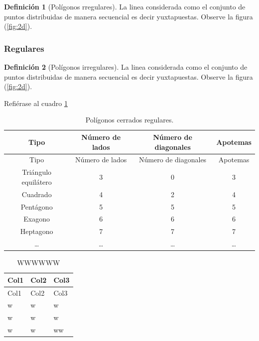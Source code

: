 \documentclass[
  16pt,
]{krantz}
\theoremstyle{definition}
\newtheorem{definition}{Definición}[chapter]
\theoremstyle{definition}
\theoremstyle{definition}
\theoremstyle{definition}
\theoremstyle{remark}
\begin{document}
\begin{definition}[Polígonos rregulares]
\protect\hypertarget{def:irregulares}{}{\label{def:irregulares} {} }La linea considerada como el conjunto de puntos distribuidas de manera secuencial es decir yuxtapuestas. Observe la figura (\ref{fig:2d}).
\end{definition}

\hypertarget{regulares}{%
\subsubsection{Regulares}\label{regulares}}

\begin{definition}[Polígonos irregulares]
\protect\hypertarget{def:regulares}{}{\label{def:regulares} {} }La linea considerada como el conjunto de puntos distribuidas de manera secuencial es decir yuxtapuestas. Observe la figura (\ref{fig:2d}).
\end{definition}

Refiérase al cuadro \ref{tab:regulares}

\begin{longtable}[]{@{}cccc@{}}
\caption{\label{tab:regulares} Polígonos cerrados regulares.}\tabularnewline
\toprule
Tipo & Número de lados & Número de diagonales & Apotemas \\
\midrule
\endfirsthead
\toprule
Tipo & Número de lados & Número de diagonales & Apotemas \\
\midrule
\endhead
Triángulo equilátero & 3 & 0 & 3 \\
Cuadrado & 4 & 2 & 4 \\
Pentágono & 5 & 5 & 5 \\
Exagono & 6 & 6 & 6 \\
Heptagono & 7 & 7 & 7 \\
\ldots{} & \ldots{} & \ldots{} & \ldots{} \\
\bottomrule
\end{longtable}

\begin{longtable}[]{@{}lll@{}}
\caption{\label{tab:regular} WWWWWW}\tabularnewline
\toprule
Col1 & Col2 & Col3 \\
\midrule
\endfirsthead
\toprule
Col1 & Col2 & Col3 \\
\midrule
\endhead
w & w & w \\
w & w & w \\
w & w & ww \\
\bottomrule
\end{longtable}
\end{document}
